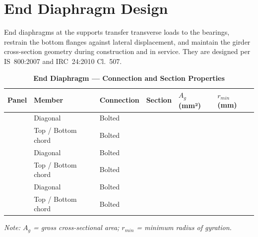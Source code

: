 \documentclass[12pt,a4paper]{report}
\numberwithin{table}{chapter}
\numberwithin{figure}{chapter}
\begin{document}
\section{End Diaphragm Design}
\label{sec:end-diaphragm}

End diaphragms at the supports transfer transverse loads to the bearings, restrain the bottom flanges against lateral displacement, and maintain the girder cross-section geometry during construction and in service. They are designed per IS~800:2007 and IRC~24:2010 Cl.~507.

\vspace{1em}

\vspace{0.4em}
\noindent
\setlength{\tabcolsep}{4pt}
\setlength{\LTleft}{0pt}
\setlength{\LTright}{\fill}

\begin{longtable}{|C{2.0cm}|L{2.0cm}|L{2.2cm}|C{2.5cm}|C{2.0cm}|C{2.0cm}|}
\caption{\textbf{End Diaphragm --- Connection and Section Properties}} \\
\hline
\textbf{Panel} & \textbf{Member} & \textbf{Connection} & \textbf{Section} & \textbf{$A_g$ (mm²)} & \textbf{$r_{min}$ (mm)} \\[6pt]
\hline
{} & Diagonal & Bolted &  &  &  \\[6pt]
 & Top / Bottom chord & Bolted &  &  &  \\[6pt]
\hline
{} & Diagonal & Bolted &  &  &  \\[6pt]
 & Top / Bottom chord & Bolted &  &  &  \\[6pt]
\hline
{} & Diagonal & Bolted &  &  &  \\[6pt]
 & Top / Bottom chord & Bolted &  &  &  \\[6pt]
\hline
\end{longtable}
\noindent\textit{Note: $A_g$ = gross cross-sectional area; $r_{min}$ = minimum radius of gyration.}
\end{document}
